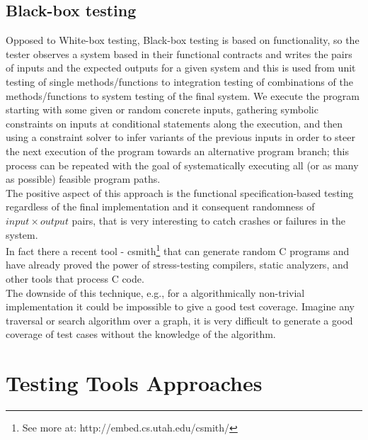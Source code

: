 \documentclass{llncs}
\begin{document}
\subsection{Black-box testing}
Opposed to White-box testing, Black-box testing is based on functionality, so the tester observes a system based in their functional contracts and writes the
pairs of inputs and the expected outputs for a given system and this is used from unit testing of single methods/functions to integration testing
of combinations of the methods/functions to system testing of the final system.
We execute the program starting with some given or random concrete inputs, gathering symbolic constraints on inputs at conditional statements along the execution,
and then using a constraint solver to infer variants of the previous inputs in order to steer the next execution of the program
towards an alternative program branch; this process can be repeated with the goal of systematically executing all (or as many as possible) feasible program paths.\\
The positive aspect of this approach is the functional specification-based testing
regardless of the final implementation and it consequent randomness of $input \times output$ pairs, that is very interesting to catch crashes or failures in the system.\\
In fact there a recent tool - csmith\footnote{See more at: http://embed.cs.utah.edu/csmith/} that can generate random C programs and have already proved
the power of stress-testing compilers, static analyzers, and other tools that process C code\cite{Yang:2011:FUB:1993316.1993532}.\\
The downside of this technique, e.g., for a algorithmically non-trivial implementation it could be impossible to give a good test coverage.
Imagine any traversal or search algorithm over a graph, it is very difficult to generate a good coverage of test cases without the knowledge of the algorithm.

\section{Testing Tools Approaches}
\end{document}
